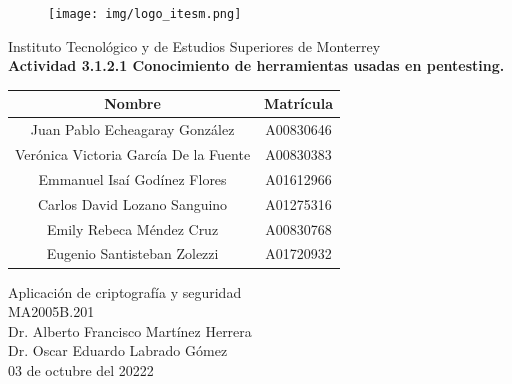 \documentclass{article}
\begin{document}
    \begin{titlepage}
        \begin{center}
            \begin{figure}
                \centering
                \texttt{[image: img/logo\_itesm.png]}\\ %
            \end{figure}
        \vspace{5cm}
        \LARGE{Instituto Tecnológico y de Estudios Superiores de Monterrey}\\
        \fontsize{12}{14}\selectfont
        \vspace{1cm}
        \textbf{Actividad 3.1.2.1 Conocimiento de herramientas usadas en pentesting. }\\ %
        \vspace{0.7cm}
        \begin{table}[h!]
            \centering
            \begin{tabular}{ ||c|c|| }
                \hline
                Nombre & Matrícula \\
                \hline
                Juan Pablo Echeagaray González & A00830646 \\
                \hline
                Verónica Victoria García De la Fuente & A00830383 \\
                \hline
                Emmanuel Isaí Godínez Flores & A01612966 \\
                \hline
                Carlos David Lozano Sanguino & A01275316 \\
                \hline
                Emily Rebeca Méndez Cruz & A00830768 \\
                \hline
                Eugenio Santisteban Zolezzi & A01720932 \\
                \hline
            \end{tabular}
        \end{table}
        \vspace{0.7cm}
        Aplicación de criptografía y seguridad\\ %
        \vspace{0.2cm}
        MA2005B.201\\ %
        \vspace{0.2cm}
        Dr. Alberto Francisco Martínez Herrera\\ %
        \vspace{0.2cm}
        Dr. Oscar Eduardo Labrado Gómez \\
        \vspace{0.7cm}
        03 de octubre del 20222\\ %
        \end{center}
    \end{titlepage}
\end{document}
